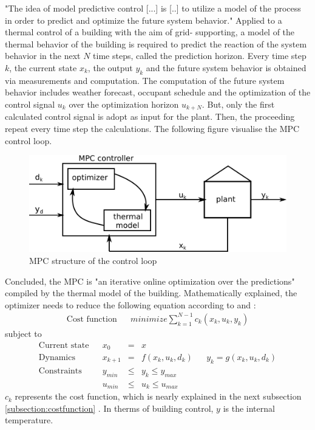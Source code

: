 "The idea of model predictive control [...] is [..] to utilize a model of the process in order to predict and optimize the future system behavior."
\cite{Grune.2017}
Applied to a thermal control of a building with the aim of grid- supporting, a model of the thermal behavior of the building is required to predict the reaction of the system behavior in the next $N$ time steps, called the prediction horizon. Every time step $k$, the current state \textbf{$x_k$}, the output \textbf{$y_k$} and the future system behavior is obtained via measurements and computation. The computation of the future system behavior includes weather forecast, occupant schedule  and the optimization of the control signal \textbf{$u_k$} over the optimization horizon \textbf{$u_{k+N}$}. But, only the first calculated control signal is adopt as input for the plant.
Then, the proceeding repeat every time step the calculations. The following figure visualise the MPC control loop.
 \begin{figure}[h]
    \centering
    \includegraphics[scale=0.8]{figure/MPC beispiel2.png}
    \caption{MPC structure of the control loop}
    \label{fig:sampleMPC}
    \end{figure}
\newline
Concluded, the MPC is "an iterative online optimization over the predictions"
\cite{Grune.2017} 
compiled by the thermal model of the building. Mathematically explained, the optimizer needs to reduce the following equation according to
\cite{Kouvaritakis.2018}
and
\cite{Oldewurtel.2012}:
\begin{align}
\label{eq:costfunc}
\textrm{Cost function} && minimize \sum_{k=1}^{N-1} c_k(x_k,u_k,y_k)
\end{align}
subject to 
\begin{align*}
\textrm{Current state} && x_0 &=& x \\	
\textrm{Dynamics} && x_{k+1}&=& f(x_k,u_k,d_k)		&&	y_k = g(x_k,u_k,d_k)\\				
\textrm{Constraints} && y_{min}&\leq& y_k \leq y_{max}\\		
\textrm{} && u_{min}&\leq& u_k \leq u_{max}	
\end{align*}
$c_k$ represents the cost function, which is nearly explained in the next subsection  \ref{subsection:costfunction}
. In therms of building control, $y$ is the internal temperature.

